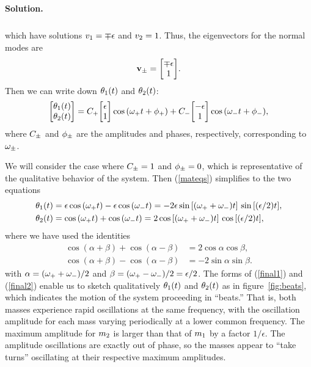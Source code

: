 \documentclass[11pt]{article}
\newcommand{\refeq}[1]{(\ref{#1})}
\newenvironment{solution}
{
    \paragraph{Solution.}
    \ignorespaces
}
{
    \bigskip
}
\begin{document}
\begin{solution}
\begin{align}
	\end{align}
	which have solutions $v_1 = \mp \epsilon$ and $v_2 = 1$.  Thus, the eigenvectors for the normal modes are
	\begin{equation}
		\vvpm = \mqty[ \mp \epsilon \\ 1 ].
	\end{equation}
	Then we can write down $\theta_1(t)$ and $\theta_2(t)$:
	\begin{equation} \label{mateqs}
		\mqty[\thq(t) \\ \thw(t) ] = \Cp \mqty[ \epsilon \\ 1 ] \cos{(\omp t + \php)} + \Cm \mqty[ -\epsilon \\ 1 ] \cos{(\omm t + \phm)},
	\end{equation}
	where $C_\pm$ and $\phi_\pm$ are the amplitudes and phases, respectively, corresponding to $\omega_\pm$.
	
	We will consider the case where $C_\pm = 1$ and $\phi_\pm = 0$, which is representative of the qualitative behavior of the system.  Then \refeq{mateqs} simplifies to the two equations
	\begin{align}
		\theta_1(t) &= \epsilon \cos{(\omega_+t)} - \epsilon \cos{(\omega_-t)} = -2 \epsilon \sin{[(\omega_++ \omega_-) t]} \,\sin{[(\epsilon / 2) t]}, \label{final1} \\
		\theta_2(t) &= \cos{(\omega_+t)} + \cos{(\omega_-t)} = 2 \cos{[(\omega_++ \omega_-) t]} \,\cos{[(\epsilon / 2) t]}, \label{final2}
	\end{align}
	where we have used the identities
	\begin{align}
		\cos{(\alpha + \beta)} + \cos{(\alpha - \beta)} &= 2 \cos{\alpha} \cos{\beta}, \label{mot1t} \\
		\cos{(\alpha + \beta)} - \cos{(\alpha - \beta)} &= -2 \sin{\alpha} \sin{\beta}. \label{mot2t}
	\end{align}
	with $\alpha = (\omega_+ + \omega_-)/2$ and $\beta = (\omega_+ - \omega_-)/2 = \epsilon/2$.  The forms of \refeq{final1} and \refeq{final2} enable us to sketch qualitatively $\theta_1(t)$ and $\theta_2(t)$ as in figure~\ref{fig:beats}, which indicates the motion of the system proceeding in ``beats.''  That is, both masses experience rapid oscillations at the same frequency, with the oscillation amplitude for each mass varying periodically at a lower common frequency.  The maximum amplitude for $m_2$ is larger than that of $m_1$ by a factor $1 / \epsilon$.  The amplitude oscillations are exactly out of phase, so the masses appear to ``take turns'' oscillating at their respective maximum amplitudes.
\end{solution}
\end{document}
